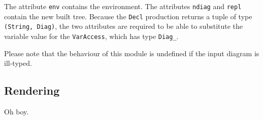 \documentclass[12pt, a4paper, twoside]{article}
\begin{document}
The attribute \texttt{env} contains the environment. The attributes \texttt{ndiag} and \texttt{repl} contain the new built tree.
Because the \texttt{Decl} production returns a tuple of type \texttt{(String, Diag)}, the two attributes are required
to be able to substitute the variable value for the \texttt{VarAccess}, which has type \texttt{Diag\_}.

Please note that the behaviour of this module is undefined if the input diagram is ill-typed.

\subsection{Rendering}
Oh boy.
\end{document}
